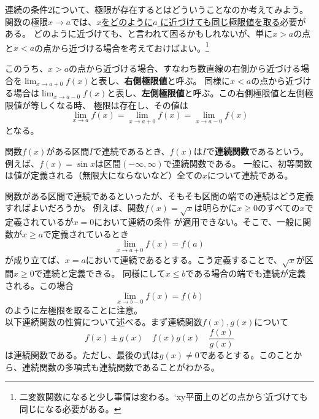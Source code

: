 \documentclass[a4j,dvipdfmx]{jsarticle}
\begin{document}
                連続の条件2について、極限が存在するとはどういうことなのか考えてみよう。関数の極限$x\to a$では、\underline{$x$をどのように$a$
                に近づけても同じ極限値を取る}必要がある。
                どのように近づけても、と言われて困るかもしれないが、単に$x>a$の点と$x<a$の点から近づける場合を考えておけばよい。\footnote{二変数関数になると少し事情は変わる。`xy平面上のどの点から'近づけても同じになる必要がある。}

                このうち、$x>a$の点から近づける場合、すなわち数直線の右側から近づける場合を$\displaystyle\lim_{x\to a+0}f(x)$と表し、\textbf{右側極限値}と呼ぶ。
                同様に$x<a$の点から近づける場合は$\displaystyle\lim_{x\to a-0}f(x)$と表し、\textbf{左側極限値}と呼ぶ。この右側極限値と左側極限値が等しくなる時、
                極限は存在し、その値は
                \begin{equation}
                    \lim_{x\to a}f(x)=\lim_{x\to a+0}f(x)=\lim_{x\to a-0}f(x)
                \end{equation}
                となる。

                関数$f(x)$がある区間$I$で連続であるとき、$f(x)$は$I$で\textbf{連続関数}であるという。例えば、$f(x)=\sin x$は区間$(-\infty,\infty)$で連続関数である。
                一般に、初等関数は値が定義される（無限大にならないなど）全ての$x$について連続である。

                関数がある区間で連続であるといったが、そもそも区間の端での連続はどう定義すればよいだろうか。
                例えば、関数$f(x)=\sqrt{x}$は明らかに$x\geq 0$のすべての$x$で定義されているが$x=0$において連続の条件
                が適用できない。そこで、一般に関数が$x\geq a$で定義されているとき
                \begin{equation}
                    \lim_{x\to a+0}f(x)=f(a)
                \end{equation}
                が成り立てば、$x=a$において連続であるとする。こう定義することで、$\sqrt{x}$が区間$x\geq 0$で連続と定義できる。
                同様にして$x\leq b$である場合の端でも連続が定義される。この場合
                \begin{equation}
                    \lim_{x\to b-0}f(x)=f(b)
                \end{equation}
                のように左極限を取ることに注意。\\

                以下連続関数の性質について述べる。まず連続関数$f(x),g(x)$について
                \begin{equation}
                    f(x)\pm g(x)\quad f(x)g(x)\quad \frac{f(x)}{g(x)}
                \end{equation}
                は連続関数である。ただし、最後の式は$g(x)\neq 0$であるとする。このことから、連続関数の多項式も連続関数であることがわかる。\\
\end{document}
